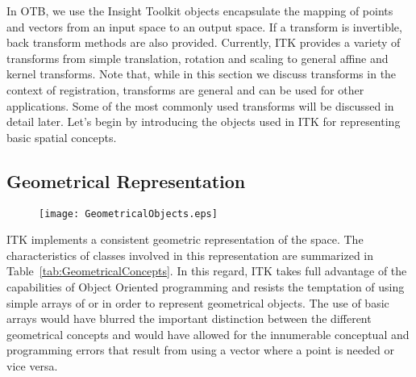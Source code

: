 
\def\tableconfiguration{ | p{3cm} | p{1.8cm} | p{2.5cm} | p{4cm} | }




In OTB, we use the Insight Toolkit  objects encapsulate the mapping of
points and vectors from an input space to an output space. If a transform is
invertible, back transform methods are also provided.  Currently, ITK provides
a variety of transforms from simple translation, rotation and scaling to
general affine and kernel transforms.  Note that, while in this section we
discuss transforms in the context of registration, transforms are general and
can be used for other applications. Some of the most commonly used transforms
will be discussed in detail later. Let's begin by introducing the objects used
in ITK for representing basic spatial concepts.


\subsection{Geometrical Representation}
\label{sec:GeometricalObjects}

\begin{figure}
\center
\texttt{[image: GeometricalObjects.eps]}
\label{fig:GeometricalObjects}
\end{figure}
 
ITK implements a consistent geometric representation of the space. The
characteristics of classes involved in this representation are summarized in
Table~\ref{tab:GeometricalConcepts}. In this regard, ITK takes full advantage
of the capabilities of Object Oriented programming and resists the temptation
of using simple arrays of  or  in order to represent
geometrical objects. The use of basic arrays would have blurred the important
distinction between the different geometrical concepts and would have allowed
for the innumerable conceptual and programming errors that result from using a
vector where a point is needed or vice versa.


